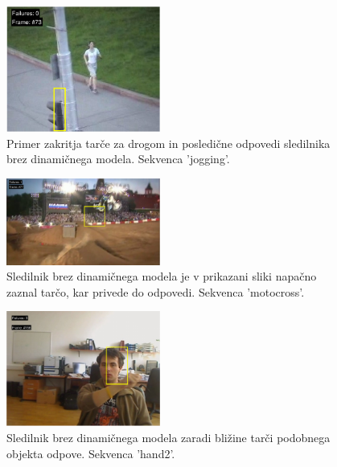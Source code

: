 \documentclass[a4paper]{article}
\begin{document}
\begin{figure}[h]
	\begin{center}
		\includegraphics [width=0.45\textwidth] {msjogging.pdf}
	\end{center}
	\caption{Primer zakritja tarče za drogom in posledične odpovedi sledilnika brez dinamičnega modela. Sekvenca 'jogging'.}
	\label{msjogging}
\end{figure}
\begin{figure}[h]
	\begin{center}
		\includegraphics [width=0.45\textwidth] {msmoto.pdf}
	\end{center}
	\caption{Sledilnik brez dinamičnega modela je v prikazani sliki napačno zaznal tarčo, kar privede do odpovedi. Sekvenca 'motocross'.}
	\label{msmoto}
\end{figure}
\begin{figure}[h]
	\begin{center}
		\includegraphics [width=0.45\textwidth] {mshand.pdf}
	\end{center}
	\caption{Sledilnik brez dinamičnega modela zaradi bližine tarči podobnega objekta odpove. Sekvenca 'hand2'.}
	\label{mshand}
\end{figure}
\end{document}
